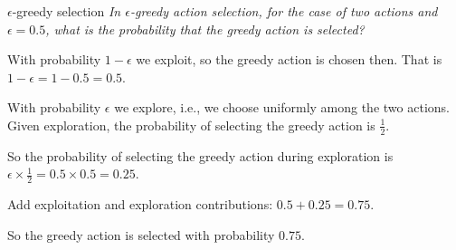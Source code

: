 \begin{Exercise}{$\epsilon$-greedy selection}{}
\textit{In $\epsilon$-greedy action selection, for the case of two actions and $\epsilon= 0.5$, what is the probability that the greedy action is
selected?}

With probability $1-\epsilon$ we exploit, so the greedy action is chosen then. That is $1-\epsilon=1-0.5=0.5$.

With probability $\epsilon$ we explore, i.e., we choose uniformly among the two actions. Given exploration, the probability of selecting the greedy action is $\frac{1}{2}$.

So the probability of selecting the greedy action during exploration is $\epsilon\times\frac{1}{2}=0.5\times 0.5=0.25$.

Add exploitation and exploration contributions: $0.5+0.25=0.75$.

So the greedy action is selected with probability $0.75$.
\end{Exercise}

